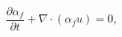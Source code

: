 \begin{equation}
\frac{\partial \alpha_f}{\partial t}   +
\nabla \cdot (\alpha_f u)   = 0 ,
 \label{eq:continuityincompressiblebis}
\end{equation}
